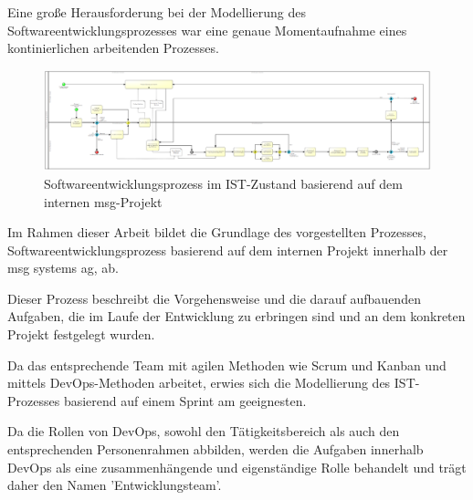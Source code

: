 Eine große Herausforderung bei der Modellierung des Softwareentwicklungsprozesses war eine genaue Momentaufnahme eines kontinierlichen arbeitenden Prozesses. 

\begin{figure}[p]
    \centering
    \includegraphics[angle=90, scale=0.6]{Bilder/IST-Prozess_neu.png}
    \caption{Softwareentwicklungsprozess im IST-Zustand basierend auf dem internen msg-Projekt}
\end{figure}

Im Rahmen dieser Arbeit bildet die Grundlage des vorgestellten Prozesses,  Softwareentwicklungsprozess basierend auf dem internen Projekt  innerhalb der msg systems ag, ab.

Dieser Prozess beschreibt die Vorgehensweise und die darauf aufbauenden Aufgaben, die im Laufe der Entwicklung zu erbringen sind und an dem konkreten Projekt festgelegt wurden.

Da das entsprechende Team mit agilen Methoden wie Scrum und Kanban und mittels DevOps-Methoden arbeitet, erwies sich die Modellierung des IST-Prozesses basierend auf einem Sprint am geeignesten.

Da die Rollen von DevOps, sowohl den Tätigkeitsbereich als auch den entsprechenden Personenrahmen abbilden, werden die Aufgaben innerhalb DevOps als eine zusammenhängende und eigenständige Rolle behandelt und trägt daher den Namen 'Entwicklungsteam'.

